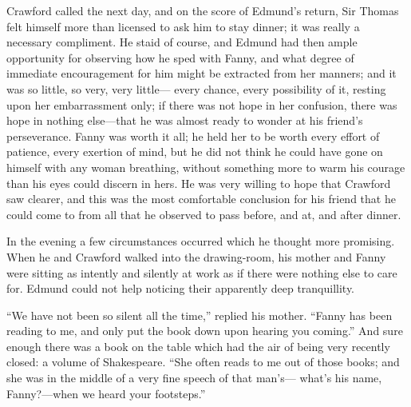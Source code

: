 \documentclass{article}
\begin{document}
Crawford called the next day, and on the score of Edmund's
return, Sir Thomas felt himself more than licensed to ask
him to stay dinner; it was really a necessary compliment.
He staid of course, and Edmund had then ample opportunity
for observing how he sped with Fanny, and what degree
of immediate encouragement for him might be extracted from
her manners; and it was so little, so very, very little---%
every chance, every possibility of it, resting upon her
embarrassment only; if there was not hope in her confusion,
there was hope in nothing else---that he was almost ready
to wonder at his friend's perseverance.  Fanny was worth
it all; he held her to be worth every effort of patience,
every exertion of mind, but he did not think he could have
gone on himself with any woman breathing, without something
more to warm his courage than his eyes could discern in hers.
He was very willing to hope that Crawford saw clearer,
and this was the most comfortable conclusion for his
friend that he could come to from all that he observed
to pass before, and at, and after dinner.

In the evening a few circumstances occurred which he thought
more promising.  When he and Crawford walked into the
drawing-room, his mother and Fanny were sitting as intently
and silently at work as if there were nothing else to care for.
Edmund could not help noticing their apparently deep tranquillity.

``We have not been so silent all the time,'' replied his mother.
``Fanny has been reading to me, and only put the book
down upon hearing you coming.''  And sure enough there
was a book on the table which had the air of being
very recently closed:  a volume of Shakespeare.
``She often reads to me out of those books; and she
was in the middle of a very fine speech of that man's---%
what's his name, Fanny?---when we heard your footsteps.''
\end{document}
